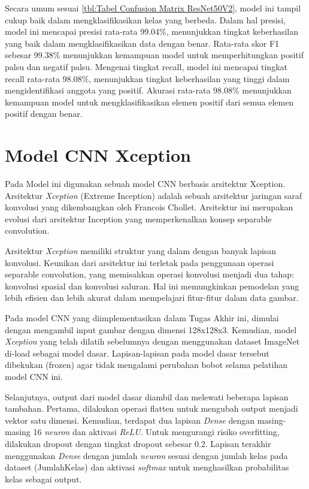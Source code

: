Secara umum sesuai \ref{tbl:Tabel Confusion Matrix ResNet50V2}, model ini tampil cukup baik dalam mengklasifikasikan kelas yang berbeda. Dalam hal presisi, model ini mencapai presisi rata-rata 99.04\%, menunjukkan tingkat keberhasilan yang baik dalam mengklasifikasikan data dengan benar. Rata-rata skor F1 sebesar 99.38\% menunjukkan kemampuan model untuk memperhitungkan positif palsu dan negatif palsu. Mengenai tingkat recall, model ini mencapai tingkat recall rata-rata 98.08\%, menunjukkan tingkat keberhasilan yang tinggi dalam mengidentifikasi anggota yang positif. Akurasi rata-rata 98.08\% menunjukkan kemampuan model untuk mengklasifikasikan elemen positif dari semua elemen positif dengan benar. 


\section{Model CNN Xception}
Pada Model ini digunakan sebuah model CNN berbasis arsitektur Xception. Arsitektur \textit{Xception} (Extreme Inception) adalah sebuah arsitektur jaringan saraf konvolusi yang dikembangkan oleh Francois Chollet. Arsitektur ini merupakan evolusi dari arsitektur Inception yang memperkenalkan konsep separable convolution.

Arsitektur \textit{Xception} memiliki struktur yang dalam dengan banyak lapisan konvolusi. Keunikan dari arsitektur ini terletak pada penggunaan operasi separable convolution, yang memisahkan operasi konvolusi menjadi dua tahap: konvolusi spasial dan konvolusi saluran. Hal ini memungkinkan pemodelan yang lebih efisien dan lebih akurat dalam mempelajari fitur-fitur dalam data gambar.

Pada model CNN yang diimplementasikan dalam Tugas Akhir ini, dimulai dengan mengambil input gambar dengan dimensi 128x128x3. Kemudian, model \textit{Xception} yang telah dilatih sebelumnya dengan menggunakan dataset ImageNet di-load sebagai model dasar. Lapisan-lapisan pada model dasar tersebut dibekukan (frozen) agar tidak mengalami perubahan bobot selama pelatihan model CNN ini.

Selanjutnya, output dari model dasar diambil dan melewati beberapa lapisan tambahan. Pertama, dilakukan operasi flatten untuk mengubah output menjadi vektor satu dimensi. Kemudian, terdapat dua lapisan \textit{Dense} dengan masing-masing 16 \textit{neuron} dan aktivasi \textit{ReLU}. Untuk mengurangi risiko overfitting, dilakukan dropout dengan tingkat dropout sebesar 0.2. Lapisan terakhir menggunakan \textit{Dense} dengan jumlah \textit{neuron} sesuai dengan jumlah kelas pada dataset (JumlahKelas) dan aktivasi \textit{softmax} untuk menghasilkan probabilitas kelas sebagai output.

